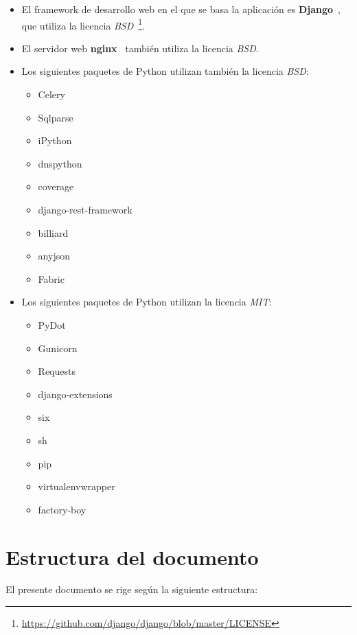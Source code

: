 \begin{itemize}

\item El framework de desarrollo web en el que se basa la aplicación es
  \textbf{Django}~\cite{django}, que utiliza la licencia
  \textit{\ac{BSD}}~\footnote{\url{https://github.com/django/django/blob/master/LICENSE}}.

\item El servidor web \textbf{nginx}~\cite{nginx} también utiliza la licencia \textit{BSD}.

\item Los siguientes paquetes de Python utilizan también la licencia \textit{BSD}:
  \begin{itemize}
  \item Celery
  \item Sqlparse
  \item iPython
  \item dnspython
  \item coverage
  \item django-rest-framework
  \item billiard
  \item anyjson
  \item Fabric
  \end{itemize}

\item Los siguientes paquetes de Python utilizan la licencia \textit{\ac{MIT}}:
  \begin{itemize}
  \item PyDot
  \item Gunicorn
  \item Requests
  \item django-extensions
  \item six
  \item sh
  \item pip
  \item virtualenvwrapper
  \item factory-boy
  \end{itemize}

\end{itemize}

\section{Estructura del documento}
El presente documento se rige según la siguiente estructura:

